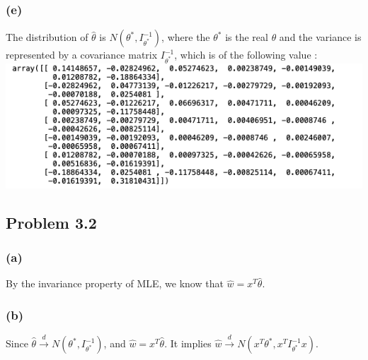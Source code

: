 \documentclass{article}
\begin{document}
\subsubsection*{(e)}
	The distribution of $\hat{\theta}$ is $N(\theta^*, I^{-1}_{\theta^{*}})$, where the $\theta^*$ is the real $\theta$ and the variance is represented by a covariance matrix $I^{-1}_{\theta^{*}}$, which is of the following  value :
	\includegraphics[scale=0.5]{fisher_v2}
	
\subsection*{Problem 3.2}
\subsubsection*{(a)}
	By the invariance property of MLE, we know that  $\hat{w} = x^T\hat{\theta}$.
\subsubsection*{(b)}
	Since  $\hat{\theta}  \xrightarrow[]{d} N(\theta^*, I^{-1}_{\theta^{*}})$, and $\hat{w} = x^T\hat{\theta}$. It implies  $\hat{w}  \xrightarrow[]{d} N(x^{T}\theta^*, x^{T}I^{-1}_{\theta^{*}}x)$.
\end{document}

